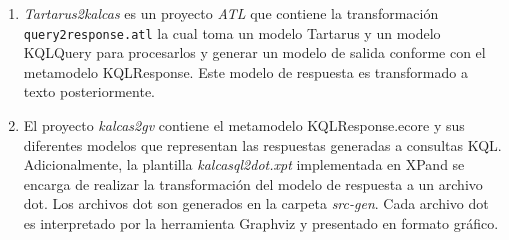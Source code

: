 \begin{enumerate}
\item \textit{Tartarus2kalcas} es un proyecto \textit{ATL} que contiene la transformaci\'on \texttt{query2response.atl} la cual toma un modelo Tartarus y un modelo KQLQuery para procesarlos y generar un modelo de salida conforme con el metamodelo KQLResponse. Este modelo de respuesta es transformado a texto posteriormente.

\item El proyecto \textit{kalcas2gv} contiene el metamodelo KQLResponse.ecore y sus diferentes modelos que representan las respuestas generadas a consultas KQL. Adicionalmente, la plantilla \textit{kalcasql2dot.xpt} implementada en XPand se encarga de realizar la transformaci\'on del modelo de respuesta a un archivo dot. Los archivos dot son generados en la carpeta \textit{src-gen}. Cada archivo dot es interpretado por la herramienta Graphviz y presentado en formato gr\'afico.

\end{enumerate}